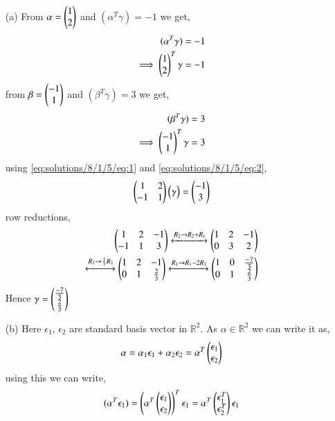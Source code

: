 \begin{enumerate}
\item[(a)] From $\alpha = \begin{pmatrix}1\\ 2\end{pmatrix}$ and $(\alpha^T\gamma)= -1$ we get,
\begin{align}
(\alpha^T\gamma)= -1 \\
\implies \begin{pmatrix}1\\2\end{pmatrix}^T\gamma =-1 \label{eq:solutions/8/1/5/eq:1}
\end{align}
from $\beta = \begin{pmatrix}-1\\ 1\end{pmatrix}$ and $(\beta^T\gamma)=3$ we get,
\begin{align}
(\beta^T\gamma)=3\\
\implies \begin{pmatrix}-1\\ 1\end{pmatrix}^T\gamma = 3 \label{eq:solutions/8/1/5/eq:2}
\end{align}
using \eqref{eq:solutions/8/1/5/eq:1} and \eqref{eq:solutions/8/1/5/eq:2},
\begin{align}
\begin{pmatrix}1&2\\-1&1\end{pmatrix}\begin{pmatrix}\gamma\end{pmatrix} =\begin{pmatrix}-1\\3\end{pmatrix}
\end{align}
row reductions,
\begin{align}
\begin{pmatrix}1&2&-1\\-1&1&3\end{pmatrix} \xleftrightarrow{ R_2\rightarrow R_2 + R_1}
\begin{pmatrix}1&2&-1\\0&3&2\end{pmatrix} \\\xleftrightarrow{ R_2\rightarrow \frac{1}{3}
R_2} \begin{pmatrix}1&2&-1\\0&1&\frac{2}{3}\end{pmatrix} \xleftrightarrow{ R_1\rightarrow R_1-2R_2} \begin{pmatrix}1&0&\frac{-7}{3}\\0&1&\frac{2}{3}\end{pmatrix}
\end{align}
Hence $\mathbf{\gamma} = \begin{pmatrix}\frac{-7}{3}\\\frac{2}{3}\end{pmatrix}$
\item[(b)] Here $\epsilon_1$, $\epsilon_2$  are standard basis vector in $\mathbb{R}^2$. As $\alpha \in \mathbb{R}^2$ we can write it as,
\begin{align}
\alpha = \alpha_1\epsilon_1+ \alpha_2\epsilon_2 = \alpha^T\begin{pmatrix}\epsilon_1\\\epsilon_2\end{pmatrix} \label{eq:solutions/8/1/5/eq:3}
\end{align}
using this we can write,
\begin{align}
(\alpha^T\epsilon_1) = \brak{\alpha^T\myvec{\epsilon_1\\\epsilon_2}}^T\epsilon_1 = \alpha^T\myvec{\epsilon_1^T\\\epsilon_2^T}\epsilon_1\\

\end{align}
\end{enumerate}
